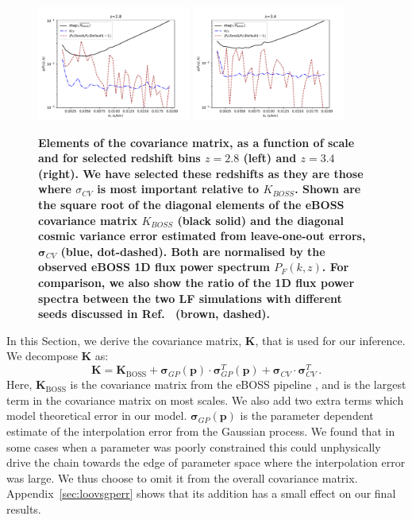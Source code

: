 \begin{figure}
    \centering
    \includegraphics[width=0.45\textwidth]{figures/err-2.8.pdf}
    \includegraphics[width=0.45\textwidth]{figures/err-3.4.pdf}
    \caption{\label{fig:covariance_loo}
     \textbf{Elements of the covariance matrix, as a function of scale and for selected redshift bins $z=2.8$ (left) and $z=3.4$ (right). We have selected these redshifts as they are those where $\sigma_{CV}$ is most important relative to $K_{BOSS}$. 
    Shown are the square root of the diagonal elements of the eBOSS covariance matrix $K_{BOSS}$ (black solid) and the diagonal cosmic variance error estimated from leave-one-out errors, $\boldsymbol{\sigma}_{CV}$ (blue, dot-dashed). Both are normalised by the observed eBOSS 1D flux power spectrum $P_F(k, z)$. For comparison, we also show the ratio of the 1D flux power spectra between the two LF simulations with different seeds discussed in Ref.~\protect\cite{2023simsuite} (brown, dashed).}}
\end{figure}

In this Section, we derive the covariance matrix, $\boldsymbol{K}$, that is used for our inference.
We decompose $\boldsymbol{K}$ as:
\begin{equation}
    \boldsymbol{K} = \boldsymbol{K}_\mathrm{BOSS} + \boldsymbol{\sigma}_{GP}(\boldsymbol{p}) \cdot \boldsymbol{\sigma}_{GP}^T (\boldsymbol{p}) + \boldsymbol{\sigma}_{CV} \cdot \boldsymbol{\sigma}_{CV}^T \,.
    \label{eq:covariance}
\end{equation}
Here, $\boldsymbol{K}_\mathrm{BOSS}$ is the covariance matrix from the eBOSS pipeline \cite{2019JCAP...07..017C}, and is the largest term in the covariance matrix on most scales.
We also add two extra terms which model theoretical error in our model.
$\boldsymbol{\sigma}_{GP}(\boldsymbol{p})$ is the parameter dependent estimate of the interpolation error from the Gaussian process.
We found that in some cases when a parameter was poorly constrained this could unphysically drive the chain towards the edge of parameter space where the interpolation error was large.
We thus choose to omit it from the overall covariance matrix.
Appendix~\ref{sec:loovsgperr} shows that its addition has a small effect on our final results.

